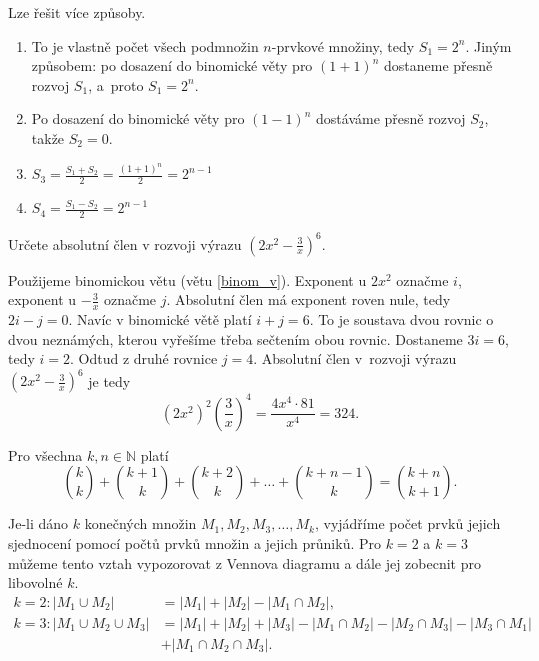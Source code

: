 \begin{reseni}
Lze řešit více způsoby.
\begin{enumerate}[$i.$]
\item To je vlastně počet všech podmnožin $n$-prvkové množiny, tedy $S_1=2^n$. Jiným
způsobem: po dosazení do binomické věty pro $(1+1)^n$ dostaneme přesně rozvoj $S_1$,
a~proto $S_1=2^n.$
\item Po dosazení do binomické věty pro $(1-1)^n$ dostáváme přesně rozvoj $S_2$,
takže $S_2=0.$
\item $S_3=\frac{S_1+S_2}{2}=\frac{(1+1)^n}{2}=2^{n-1}$
\item $S_4=\frac{S_1-S_2}{2}=2^{n-1}$
\end{enumerate}
\end{reseni}

\begin{priklad}
Určete absolutní člen v rozvoji výrazu $\left(2x^2-\frac{3}{x}\right)^6$.
\end{priklad}

\begin{reseni}
Použijeme binomickou větu (větu \ref{binom_v}).
Exponent u $2x^2$ označme $i$, exponent u $-\frac{3}{x}$ označme $j$. Absolutní člen má
exponent roven nule, tedy $2i-j=0$. Navíc v binomické větě platí $i+j=6$. To je
soustava dvou rovnic o dvou neznámých, kterou vyřešíme třeba sečtením obou rovnic. Dostaneme
$3i=6$, tedy $i=2$. Odtud z druhé rovnice $j=4$. Absolutní člen v~rozvoji výrazu $\left(2x^2-\frac{3}{x}\right)^6$
je tedy
$$
    \left (2x^2\right)^2 \left(\frac{3}{x}\right)^4=\frac{4x^4 \cdot 81}{x^4}=324.
$$
\end{reseni}

\begin{veta}
    Pro všechna $k,n \in \mathbb N$ platí
    $$\binom{k}{k} + \binom{k+1}{k}+\binom{k+2}{k}+\dots + \binom{k+n-1}{k}=
    \binom{k+n}{k+1}.$$
\end{veta}

\begin{pozn}
	Je-li dáno $k$ konečných množin $M_1, M_2, M_3, \dots, M_k$, vyjádříme počet prvků jejich sjednocení pomocí počtů prvků množin a jejich průniků. Pro $k=2$ a $k=3$ můžeme tento vztah vypozorovat z Vennova diagramu a dále jej zobecnit pro libovolné $k$.
	\begin{align*}
	k=2\colon |M_1\cup M_2| &= |M_1|+|M_2|-|M_1 \cap M_2|,\\
	k=3\colon |M_1\cup M_2 \cup M_3| &= |M_1|+|M_2|+|M_3|-|M_1 \cap M_2|-|M_2 \cap M_3|-|M_3\cap M_1|\\&+|M_1 \cap M_2 \cap M_3|.
	\end{align*}
\end{pozn}

